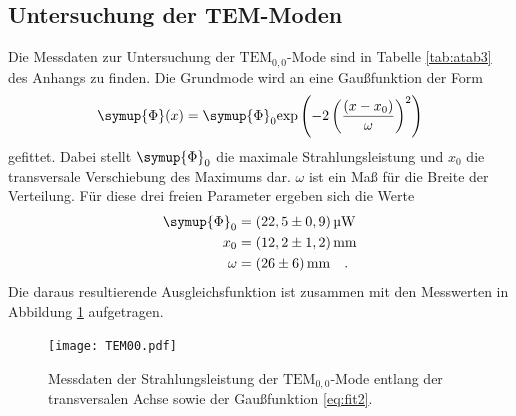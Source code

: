 \subsection{Untersuchung der TEM-Moden}
Die Messdaten zur Untersuchung der $\text{TEM}_{0,0}$-Mode sind in Tabelle \ref{tab:atab3} des Anhangs zu finden. 
Die Grundmode wird an eine Gaußfunktion der Form
\begin{equation}
\symup{\Phi}(x) = \symup{\Phi}_0 \text{exp}\left(-2\left(\frac{(x-x_0)}{\omega}\right)^2\right) \label{eq:fit2}
\end{equation}
gefittet. 
Dabei stellt $\symup{\Phi}_0$ die maximale Strahlungsleistung und $x_0$ die transversale Verschiebung des Maximums dar. 
$\omega$ ist ein Maß für die Breite der Verteilung. 
Für diese drei freien Parameter ergeben sich die Werte
\begin{align}
\symup{\Phi}_0 &= (22,5 \pm 0,9)\,\si{\micro\watt} \\
x_0 &= (12,2 \pm 1,2)\,\si{\mm}\\
\omega &= (26\pm6)\,\si{\mm} \quad .
\end{align}
Die daraus resultierende Ausgleichsfunktion ist zusammen mit den Messwerten in Abbildung \ref{fig:afig3} aufgetragen.
\noindent
\FloatBarrier
\begin{figure}[h]
\centering
\texttt{[image: TEM00.pdf]}
\caption{Messdaten der Strahlungsleistung der $\text{TEM}_{0,0}$-Mode entlang der transversalen Achse sowie der Gaußfunktion \eqref{eq:fit2}.}
\label{fig:afig3}
\end{figure}
\FloatBarrier

